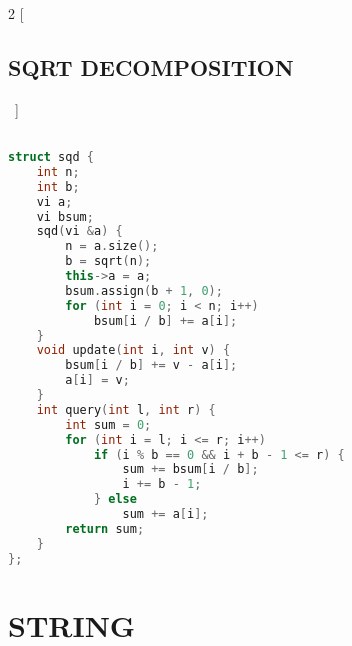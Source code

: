 \documentclass[leter]{amsart}
\begin{document}
\begin{multicols}{2}
[\subsection{SQRT DECOMPOSITION}\ ]
\begin{lstlisting}[language=C++]

struct sqd {
    int n;
    int b;
    vi a;
    vi bsum;
    sqd(vi &a) {
        n = a.size();
        b = sqrt(n);
        this->a = a;
        bsum.assign(b + 1, 0);
        for (int i = 0; i < n; i++)
            bsum[i / b] += a[i];
    }
    void update(int i, int v) {
        bsum[i / b] += v - a[i];
        a[i] = v;
    }
    int query(int l, int r) {
        int sum = 0;
        for (int i = l; i <= r; i++)
            if (i % b == 0 && i + b - 1 <= r) {
                sum += bsum[i / b];
                i += b - 1;
            } else
                sum += a[i];
        return sum;
    }
};


\end{lstlisting}
\end{multicols}
\enlargethispage*{\baselineskip}\section{STRING}
\end{document}
